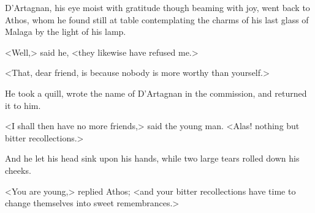 D'Artagnan, his eye moist with gratitude though beaming with joy, went back to Athos, whom he found still at table contemplating the charms of his last glass of Malaga by the light of his lamp. 

<Well,> said he, <they likewise have refused me.> 

<That, dear friend, is because nobody is more worthy than yourself.> 

He took a quill, wrote the name of D'Artagnan in the commission, and returned it to him. 

<I shall then have no more friends,> said the young man. <Alas! nothing but bitter recollections.> 

And he let his head sink upon his hands, while two large tears rolled down his cheeks. 

<You are young,> replied Athos; <and your bitter recollections have time to change themselves into sweet remembrances.> 


